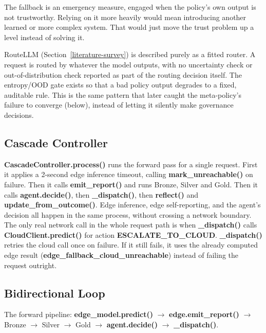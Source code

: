The fallback is an emergency measure, engaged when the policy's own
output is not trustworthy. Relying on it more heavily would mean
introducing another learned or more complex system. That would just
move the trust problem up a level instead of solving it.

RouteLLM (Section~\ref{literature-survey}) is described purely as a fitted router. A request
is routed by whatever the model outputs, with no uncertainty check or
out-of-distribution check reported as part of the routing decision
itself. The entropy/OOD gate exists so that a bad policy
output degrades to a fixed, auditable rule. This is the same pattern that later caught the meta-policy's
failure to converge (below), instead of letting it silently make
governance decisions.

\hypertarget{cascade-controller}{%
\subsection{Cascade Controller}\label{cascade-controller}}

\textbf{CascadeController.process()} runs the forward pass for a single
request. First it applies a 2-second edge inference timeout, calling
\textbf{mark\_unreachable()} on failure. Then it calls
\textbf{emit\_report()} and runs Bronze, Silver and Gold. Then it calls
\textbf{agent.decide()}, then \textbf{\_dispatch()}, then
\textbf{reflect()} and \textbf{update\_from\_outcome()}. Edge inference,
edge self-reporting, and the agent's decision all happen in the same
process, without crossing a network boundary. The only real network
call in the whole request path is when \textbf{\_dispatch()} calls
\textbf{CloudClient.predict()} for action \textbf{ESCALATE\_TO\_CLOUD}.
\textbf{\_dispatch()} retries the cloud call once on failure. If it
still fails, it uses the already computed edge result
(\textbf{edge\_fallback\_cloud\_unreachable}) instead of failing the
request outright.

\hypertarget{bidirectional-loop}{%
\subsection{Bidirectional Loop}\label{bidirectional-loop}}

The forward pipeline: \textbf{edge\_model.predict()} $\rightarrow$ \textbf{edge.emit\_report()} $\rightarrow$
Bronze $\rightarrow$ Silver $\rightarrow$ Gold $\rightarrow$ \textbf{agent.decide()} $\rightarrow$ \textbf{\_dispatch()}.

